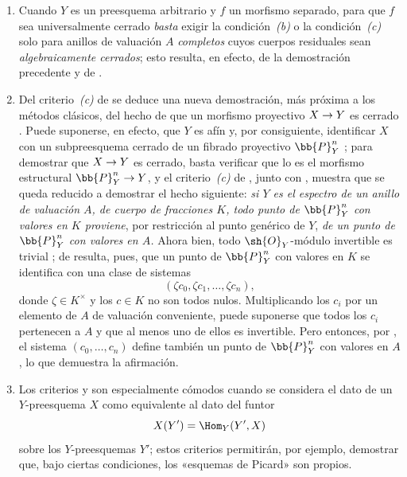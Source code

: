 \documentclass[oneside,10pt]{amsart}
\makeatletter
\newcommand{\ega@arrow}[2]{\mathchoice{#1}{#2}{#2}{#2}}
\renewcommand{\to}{\ega@arrow{\longrightarrow}{\rightarrow}}
\newcommand{\oldpage}[2][]{\marginnote{\normalfont\footnotesize\textbf{#1}~|~#2}\ignorespaces}
\let\EGAOriginalLabel\label
\renewcommand{\label}[1]{\phantomsection\EGAOriginalLabel{#1}}
\makeatother
\begin{document}

\begin{remarks}[7.3.9]
\label{II.7.3.9}
\begin{enumerate}
  \item[\rm{(i)}] Cuando $Y$ es un preesquema arbitrario y $f$ un morfismo separado, para que $f$ sea universalmente cerrado \emph{basta} exigir la condición~\emph{(b)} o la condición~\emph{(c)} solo para anillos de valuación $A$ \emph{completos} cuyos cuerpos residuales sean \emph{algebraicamente cerrados};
  esto resulta, en efecto, de la demostración precedente y de .

  \item[\rm{(ii)}] Del criterio~\emph{(c)} de  se deduce una nueva demostración, más próxima a los métodos clásicos, del hecho de que un morfismo proyectivo $X\to Y$ es cerrado .
  Puede suponerse, en efecto, que $Y$ es afín y, por consiguiente, identificar $X$ con un subpreesquema cerrado de un fibrado proyectivo $\bb{P}_Y^n$ ;
  para demostrar que $X\to Y$ es cerrado, basta verificar que lo es el morfismo estructural $\bb{P}_Y^n\to Y$, y el criterio~\emph{(c)} de , junto con , muestra que se queda reducido a demostrar el hecho siguiente:
  \emph{si $Y$ es el espectro de un anillo de valuación $A$, de cuerpo de fracciones $K$, todo punto de $\bb{P}_Y^n$ con valores en $K$ proviene}, por restricción al punto genérico de $Y$, \emph{de un punto de $\bb{P}_Y^n$ con valores en $A$.}
  Ahora bien, todo $\sh{O}_Y$-módulo invertible es trivial ;
  de  resulta, pues, que un punto de $\bb{P}_Y^n$ con valores en $K$ se identifica con una clase de sistemas
  \[
    (\zeta c_0,\zeta c_1,\ldots,\zeta c_n),
  \]
  donde $\zeta\in K^\times$ y los $c\in K$ no son todos nulos.
  Multiplicando los $c_i$ por un elemento de $A$ de
\oldpage[II]{146}
  valuación conveniente, puede suponerse que todos los $c_i$ pertenecen a $A$ y que al menos uno de ellos es invertible.
  Pero entonces, por , el sistema $(c_0,\ldots,c_n)$ define también un punto de $\bb{P}_Y^n$ con valores en $A$, lo que demuestra la afirmación.

  \item[\rm{(iii)}] Los criterios  y  son especialmente cómodos cuando se considera el dato de un $Y$-preesquema $X$ como equivalente al dato del funtor
  \[
    X(Y')=\Hom_Y(Y',X)
  \]
  sobre los $Y$-preesquemas $Y'$;
  estos criterios permitirán, por ejemplo, demostrar que, bajo ciertas condiciones, los «esquemas de Picard» son propios.
\end{enumerate}
\end{remarks}
\end{document}
